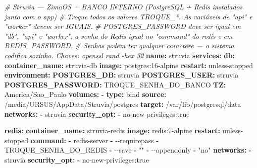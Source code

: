 \documentclass[
  10pt,
]{article}
\newenvironment{Shaded}{\begin{snugshade}}{\end{snugshade}}
\newcommand{\AttributeTok}[1]{\textcolor[rgb]{0.13,0.29,0.53}{#1}}
\newcommand{\CommentTok}[1]{\textcolor[rgb]{0.56,0.35,0.01}{\textit{#1}}}
\newcommand{\FunctionTok}[1]{\textcolor[rgb]{0.13,0.29,0.53}{\textbf{#1}}}
\newcommand{\KeywordTok}[1]{\textcolor[rgb]{0.13,0.29,0.53}{\textbf{#1}}}
\newcommand{\StringTok}[1]{\textcolor[rgb]{0.31,0.60,0.02}{#1}}
\begin{document}
\begin{Shaded}
\begin{Highlighting}[]
\CommentTok{\# Struvia — ZimaOS · BANCO INTERNO (PostgreSQL + Redis instalados junto com o app)}
\CommentTok{\# Troque todos os valores TROQUE\_*. As variáveis de "api" e "worker" devem ser IGUAIS.}
\CommentTok{\# POSTGRES\_PASSWORD deve ser igual em "db", "api" e "worker"; a senha do Redis igual no "command" do redis e em REDIS\_PASSWORD.}
\CommentTok{\# Senhas podem ter qualquer caractere — o sistema codifica sozinho. Chaves: openssl rand {-}hex 32}
\FunctionTok{name}\KeywordTok{:}\AttributeTok{ struvia}
\FunctionTok{services}\KeywordTok{:}
\AttributeTok{  }\FunctionTok{db}\KeywordTok{:}
\AttributeTok{    }\FunctionTok{container\_name}\KeywordTok{:}\AttributeTok{ struvia{-}db}
\AttributeTok{    }\FunctionTok{image}\KeywordTok{:}\AttributeTok{ postgres:16{-}alpine}
\AttributeTok{    }\FunctionTok{restart}\KeywordTok{:}\AttributeTok{ unless{-}stopped}
\AttributeTok{    }\FunctionTok{environment}\KeywordTok{:}
\AttributeTok{      }\FunctionTok{POSTGRES\_DB}\KeywordTok{:}\AttributeTok{ struvia}
\AttributeTok{      }\FunctionTok{POSTGRES\_USER}\KeywordTok{:}\AttributeTok{ struvia}
\AttributeTok{      }\FunctionTok{POSTGRES\_PASSWORD}\KeywordTok{:}\AttributeTok{ TROQUE\_SENHA\_DO\_BANCO}
\AttributeTok{      }\FunctionTok{TZ}\KeywordTok{:}\AttributeTok{ America/Sao\_Paulo}
\AttributeTok{    }\FunctionTok{volumes}\KeywordTok{:}
\AttributeTok{      }\KeywordTok{{-}}\AttributeTok{ }\FunctionTok{type}\KeywordTok{:}\AttributeTok{ bind}
\AttributeTok{        }\FunctionTok{source}\KeywordTok{:}\AttributeTok{ /media/URSUS/AppData/Struvia/postgres}
\AttributeTok{        }\FunctionTok{target}\KeywordTok{:}\AttributeTok{ /var/lib/postgresql/data}
\AttributeTok{    }\FunctionTok{networks}\KeywordTok{:}
\AttributeTok{      }\KeywordTok{{-}}\AttributeTok{ struvia}
\AttributeTok{    }\FunctionTok{security\_opt}\KeywordTok{:}
\AttributeTok{      }\KeywordTok{{-}}\AttributeTok{ no{-}new{-}privileges:true}

\AttributeTok{  }\FunctionTok{redis}\KeywordTok{:}
\AttributeTok{    }\FunctionTok{container\_name}\KeywordTok{:}\AttributeTok{ struvia{-}redis}
\AttributeTok{    }\FunctionTok{image}\KeywordTok{:}\AttributeTok{ redis:7{-}alpine}
\AttributeTok{    }\FunctionTok{restart}\KeywordTok{:}\AttributeTok{ unless{-}stopped}
\AttributeTok{    }\FunctionTok{command}\KeywordTok{:}
\AttributeTok{      }\KeywordTok{{-}}\AttributeTok{ redis{-}server}
\AttributeTok{      }\KeywordTok{{-}}\AttributeTok{ {-}{-}requirepass}
\AttributeTok{      }\KeywordTok{{-}}\AttributeTok{ TROQUE\_SENHA\_DO\_REDIS}
\AttributeTok{      }\KeywordTok{{-}}\AttributeTok{ {-}{-}save}
\AttributeTok{      }\KeywordTok{{-}}\AttributeTok{ }\StringTok{""}
\AttributeTok{      }\KeywordTok{{-}}\AttributeTok{ {-}{-}appendonly}
\AttributeTok{      }\KeywordTok{{-}}\AttributeTok{ }\StringTok{"no"}
\AttributeTok{    }\FunctionTok{networks}\KeywordTok{:}
\AttributeTok{      }\KeywordTok{{-}}\AttributeTok{ struvia}
\AttributeTok{    }\FunctionTok{security\_opt}\KeywordTok{:}
\AttributeTok{      }\KeywordTok{{-}}\AttributeTok{ no{-}new{-}privileges:true}


\end{Highlighting}
\end{Shaded}
\end{document}
